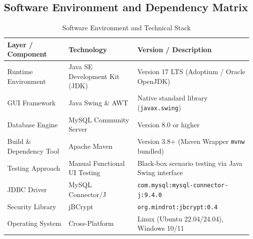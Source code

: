 \subsection{Software Environment and Dependency Matrix}
\begin{table}[h!]
    \centering
    \small
    \caption{Software Environment and Technical Stack}
    \begin{tabularx}{\textwidth}{>{\raggedright\arraybackslash}p{3.8cm} >{\raggedright\arraybackslash}p{4.2cm} >{\raggedright\arraybackslash}X}
        \toprule
        \textbf{Layer / Component} & \textbf{Technology} & \textbf{Version / Description} \\
        \midrule
        Runtime Environment & Java SE Development Kit (JDK) & Version 17 LTS (Adoptium / Oracle OpenJDK) \\
        GUI Framework & Java Swing \& AWT & Native standard library (\texttt{javax.swing}) \\
        Database Engine & MySQL Community Server & Version 8.0 or higher \\
        Build \& Dependency Tool & Apache Maven & Version 3.8+ (Maven Wrapper \texttt{mvnw} bundled) \\
        Testing Approach & Manual Functional UI Testing & Black-box scenario testing via Java Swing interface \\
        JDBC Driver & MySQL Connector/J & \texttt{com.mysql:}\allowbreak\texttt{mysql-connector-j:}\allowbreak\texttt{9.4.0} \\
        Security Library & jBCrypt & \texttt{org.mindrot:}\allowbreak\texttt{jbcrypt:0.4} \\
        Operating System & Cross-Platform & Linux (Ubuntu 22.04/24.04), Windows 10/11 \\
        \bottomrule
    \end{tabularx}
    \label{tab:software_specs}
\end{table}
